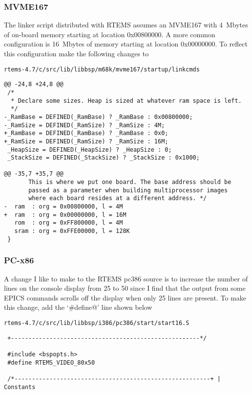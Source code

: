 \documentclass{report}
\newcommand{\rtemsVersion}{4.7}
\begin{document}
\subsubsection {MVME167}
The linker script distributed with RTEMS assumes an MVME167 with 4~Mbytes of
on-board memory starting at location 0x00800000.  A more common configuration
is 16~Mbytes of memory starting at location 0x00000000.  To reflect this
configuration make the following changes to
\begin{alltt}
rtems-\rtemsVersion/c/src/lib/libbsp/m68k/mvme167/startup/linkcmds
\end{alltt}
\begin{verbatim}
@@ -24,8 +24,8 @@
 /*
  * Declare some sizes. Heap is sized at whatever ram space is left.
  */
-_RamBase = DEFINED(_RamBase) ? _RamBase : 0x00800000;
-_RamSize = DEFINED(_RamSize) ? _RamSize : 4M;
+_RamBase = DEFINED(_RamBase) ? _RamBase : 0x0;
+_RamSize = DEFINED(_RamSize) ? _RamSize : 16M;
 _HeapSize = DEFINED(_HeapSize) ? _HeapSize : 0;
 _StackSize = DEFINED(_StackSize) ? _StackSize : 0x1000;
 
@@ -35,7 +35,7 @@
       This is where we put one board. The base address should be
       passed as a parameter when building multiprocessor images
       where each board resides at a different address. */
-  ram  : org = 0x00800000, l = 4M
+  ram  : org = 0x00000000, l = 16M
   rom  : org = 0xFF800000, l = 4M
   sram : org = 0xFFE00000, l = 128K
 }
\end{verbatim}

\subsubsection {PC-x86}
A change I like to make to the RTEMS pc386 source is
to increase the number of lines on the console display from 25 to 50 since
I find that the output from some EPICS commands  scrolls off the display
when only 25 lines are present.
To make this change, add the `\verb@#define@' line shown below
\begin{alltt}
rtems-\rtemsVersion/c/src/lib/libbsp/i386/pc386/start/start16.S
\end{alltt}
\begin{verbatim}
 +------------------------------------------------------*/
 
 #include <bspopts.h>
 #define RTEMS_VIDEO_80x50
 
 /*--------------------------------------------------------+ | Constants
\end{verbatim}
\end{document}
